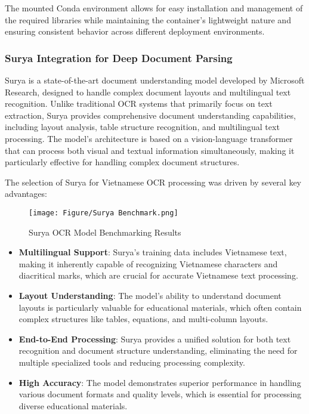 \documentclass[../Main.tex]{subfiles}
\begin{document}
The mounted Conda environment allows for easy installation and management of the required libraries while maintaining the container's lightweight nature and ensuring consistent behavior across different deployment environments.

\subsubsection{Surya Integration for Deep Document Parsing}
\label{section:5.1.2.2_surya_integration_for_deep_document_parsing}

Surya is a state-of-the-art document understanding model developed by Microsoft Research, designed to handle complex document layouts and multilingual text recognition. Unlike traditional OCR systems that primarily focus on text extraction, Surya provides comprehensive document understanding capabilities, including layout analysis, table structure recognition, and multilingual text processing. The model's architecture is based on a vision-language transformer that can process both visual and textual information simultaneously, making it particularly effective for handling complex document structures.

The selection of Surya for Vietnamese OCR processing was driven by several key advantages:

\begin{minipage}[t]{0.3\textwidth}
    \begin{figure}[H]
        \texttt{[image: Figure/Surya Benchmark.png]}
        \caption{Surya OCR Model Benchmarking Results}
        \label{fig:Surya_Benchmarking_Results}
    \end{figure}
\end{minipage}
\hfill
\begin{minipage}[t]{0.7\textwidth}
    \begin{itemize}
        \item \textbf{Multilingual Support}: Surya's training data includes Vietnamese text, making it inherently capable of recognizing Vietnamese characters and diacritical marks, which are crucial for accurate Vietnamese text processing.
        
        \item \textbf{Layout Understanding}: The model's ability to understand document layouts is particularly valuable for educational materials, which often contain complex structures like tables, equations, and multi-column layouts.
        
        \item \textbf{End-to-End Processing}: Surya provides a unified solution for both text recognition and document structure understanding, eliminating the need for multiple specialized tools and reducing processing complexity.
        
        \item \textbf{High Accuracy}: The model demonstrates superior performance in handling various document formats and quality levels, which is essential for processing diverse educational materials.
    \end{itemize}
\end{minipage}
\end{document}
